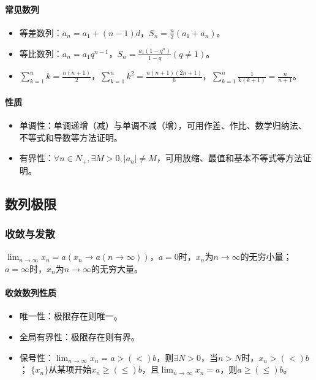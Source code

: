 \documentclass[
12pt, %
a4paper, 
oneside, %
headinclude,footinclude, %
]{scrartcl}
\begin{document}
\paragraph{常见数列}
\begin{itemize}
\item 等差数列：$ a_n = a_1 +(n - 1)d $，$ S_n = \frac{n}{2}(a_1 + a_n) $。
\item 等比数列：$ a_n = a_{1}q^{n - 1} $，$ S_n = \frac{a_1(1 - q^n)}{1 - q}(q \neq 1) $。
\item $ \sum_{k = 1}^{n} k = \frac{n(n + 1)}{2} $，$ \sum_{k = 1}^{n} k^2 = \frac{n(n + 1)(2n + 1)}{6} $，$ \sum_{k = 1}^{n} \frac{1}{k(k + 1)} = \frac{n}{n + 1} $。 \\
\end{itemize}
\paragraph{性质}
\begin{itemize}
\item 单调性：单调递增（减）与单调不减（增），可用作差、作比、数学归纳法、不等式和导数等方法证明。
\item 有界性：$ \forall n \in N_+ ,\exists M > 0, |a_n| \neq M $，可用放缩、最值和基本不等式等方法证明。
\end{itemize}
\subsection[数列极限]{数列极限}
\subsubsection[收敛与发散]{收敛与发散}
$ \lim_{n \to \infty} x_n = a(x_n \to a(n \to \infty)) $，$ a = 0 $时，$ x_n $为$ n \to \infty $的无穷小量；$ a = \infty $时，$ x_n $为$ n \to \infty $的无穷大量。
\paragraph{收敛数列性质}
\begin{itemize}
\item 唯一性：极限存在则唯一。
\item 全局有界性：极限存在则有界。
\item 保号性：$ \lim_{n \to \infty} x_n = a >(<) b $，则$ \exists N > 0 $，当$ n > N $时，$ x_n >(<) b $； $ \{x_n\} $从某项开始$ x_n \geq(\leq) b $，且$ \lim_{n \to \infty} x_n = a $，则$ a \geq(\leq) b $。
\end{itemize}
\end{document}
